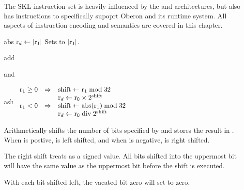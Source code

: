 
The SKL instruction set is heavily influenced by the \mips and
\natsemi architectures, but also has instructions to specifically
supoprt Oberon and its runtime system.  All aspects of instruction
encoding and semantics are covered in this chapter.


\begin{instruction}{abs}
           {$\textrm{r}_{d} \leftarrow |\textrm{r}_{1}|$}
           {Sets \dr to $|\textrm{r}_{1}|$.}
\end{instruction}


\begin{instruction}{add}
\end{instruction}


\begin{instruction}{and}
\end{instruction}


\begin{instruction}{ash}
     {
       \begin{math}
         \begin{array}{rcl}
           \sr{1} \geq 0 & \implies & \textrm{shift} \becomes \sr{1} \bmod 32        \\
              &          & \dr \becomes \sr{0} \times 2^\textrm{shift}   \\
           \sr{1} <    0 & \implies & \textrm{shift} \becomes \abs{\sr{1}} \bmod 32  \\
                         &          & \dr \becomes \sr{0} \bdiv {2^\textrm{shift}} \\
         \end{array}
       \end{math}
     }
     {
       Arithmetically shifts  the number of bits specified by
        and stores the result in \dr.  When  is postive,
        is left shifted, and when  is negative,  is
       right shifted.

       The right shift treats  as a signed value.  All bits
       shifted into the uppermost bit will have the same value as the
       uppermost bit before the shift is executed.

       With each bit shifted left, the vacated bit zero will set
       to zero.
     }
\end{instruction}


